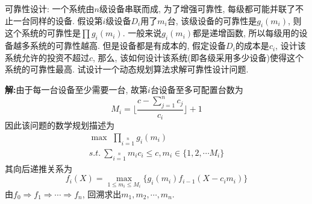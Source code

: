 \begin{problem}[习题5.4]
可靠性设计: 一个系统由$n$级设备串联而成, 为了增强可靠性, 每级都可能并联了不止一台同样的设备. 假设第$i$级设备$D_i$用了$m_i$台, 该级设备的可靠性是$g_i(m_i)$, 则这个系统的可靠性是$\prod g_i(m_i)$. 一般来说$g_i(m_i)$都是递增函数, 所以每级用的设备越多系统的可靠性越高. 但是设备都是有成本的, 假定设备$D_i$的成本是$c_i$, 设计该系统允许的投资不超过$c$, 那么, 该如何设计该系统(即各级采用多少设备)使得这个系统的可靠性最高. 试设计一个动态规划算法求解可靠性设计问题.
\end{problem}
\begin{solution}
\textbf{解:}由于每一台设备至少需要一台, 故第$i$台设备至多可配置台数为
\[
M_i = \Big\lfloor \frac{c-\sum_{j=1}^n c_j}{c_i}\Big\rfloor + 1
\]
因此该问题的数学规划描述为
\begin{align*}
&\max\,\, \prod\limits_{i=1}\limits^n g_i(m_i)\\
&s.t. {~} \sum\limits_{i=1}\limits^n m_i c_i \leq c, m_i\in \{1, 2, \cdots M_i\}&
\end{align*}
其向后递推关系为
\[
f_i(X) = \max\limits_{1\leq m_i\leq M_i}\{g_i(m_i)f_{i-1}(X-c_im_i)\} 
\]
由$f_0\Rightarrow f_1 \Rightarrow\cdots\Rightarrow f_n$, 回溯求出$m_1, m_2, \cdots, m_n$.
\end{solution}
